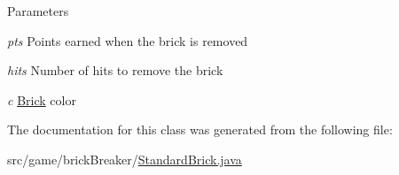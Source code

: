 \begin{DoxyParams}{Parameters}
\item[{\em pts}]Points earned when the brick is removed \item[{\em hits}]Number of hits to remove the brick \item[{\em c}]\hyperlink{classbrick_breaker_1_1_brick}{Brick} color \end{DoxyParams}


The documentation for this class was generated from the following file:\begin{DoxyCompactItemize}
\item 
src/game/brickBreaker/\hyperlink{_standard_brick_8java}{StandardBrick.java}\end{DoxyCompactItemize}
